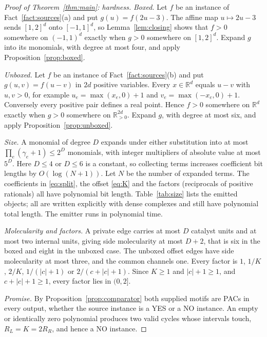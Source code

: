 \documentclass[11pt,a4paper]{article}
\theoremstyle{plain}
\theoremstyle{definition}
\theoremstyle{remark}
\newcommand{\R}{\mathbb{R}}
\begin{document}
\begin{proof}[Proof of Theorem~\ref{thm:main}: hardness]
\emph{Boxed.} Let $f$ be an instance of Fact~\ref{fact:sources}(a) and put $g(u)=f(2u-3)$. The affine map $u\mapsto2u-3$ sends $[1,2]^d$ onto $[-1,1]^d$, so Lemma~\ref{lem:closing} shows that $f>0$ somewhere on $(-1,1)^d$ exactly when $g>0$ somewhere on $[1,2]^d$. Expand $g$ into its monomials, with degree at most four, and apply Proposition~\ref{prop:boxed}.

\emph{Unboxed.} Let $f$ be an instance of Fact~\ref{fact:sources}(b) and put $g(u,v)=f(u-v)$ in $2d$ positive variables. Every $x\in\R^d$ equals $u-v$ with $u,v>0$, for example $u_e=\max(x_e,0)+1$ and $v_e=\max(-x_e,0)+1$. Conversely every positive pair defines a real point. Hence $f>0$ somewhere on $\R^d$ exactly when $g>0$ somewhere on $\R^{2d}_{>0}$. Expand $g$, with degree at most six, and apply Proposition~\ref{prop:unboxed}.

\emph{Size.} A monomial of degree $D$ expands under either substitution into at most $\prod_e(\gamma_e+1)\le2^{D}$ monomials, with integer multipliers of absolute value at most $5^D$. Here $D\le4$ or $D\le6$ is a constant, so collecting terms increases coefficient bit lengths by $O(\log(N+1))$. Let $N$ be the number of expanded terms. The coefficients in \eqref{eq:split}, the offset \eqref{eq:K} and the factors (reciprocals of positive rationals) all have polynomial bit length. Table~\ref{tab:size} lists the emitted objects; all are written explicitly with dense complexes and still have polynomial total length. The emitter runs in polynomial time.

\emph{Molecularity and factors.} A private edge carries at most $D$ catalyst units and at most two internal units, giving side molecularity at most $D+2$, that is six in the boxed and eight in the unboxed case. The unboxed offset edges have side molecularity at most three, and the common channels one. Every factor is $1$, $1/K$, $2/K$, $1/(|c|+1)$ or $2/(c+|c|+1)$. Since $K\ge1$ and $|c|+1\ge1$, and $c+|c|+1\ge1$, every factor lies in $(0,2]$.

\emph{Promise.} By Proposition~\ref{prop:comparator} both supplied motifs are PACs in every output, whether the source instance is a YES or a NO instance. An empty or identically zero polynomial produces two valid cycles whose intervals touch, $R_L=K=2R_R$, and hence a NO instance.
\end{proof}
\end{document}
